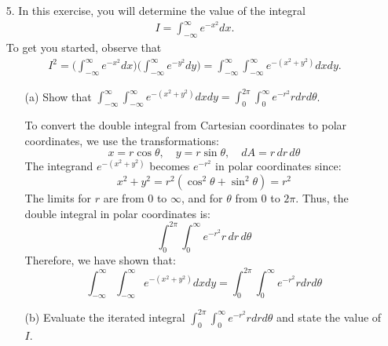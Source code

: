 \documentclass[reqno, 12pt]{amsart}
\begin{document}
\begin{itemize}
  \item[5.] In this exercise, you will determine the value of the integral
    \begin{align*}
      I = \int_{-\infty}^\infty e^{-x^2}dx.
    \end{align*}
    To get you started, observe that
    \begin{align*}
      I^2 = \Big(\int_{-\infty}^\infty e^{-x^2}dx\Big)\Big(\int_{-\infty}^\infty e^{-y^2}dy\Big) = \int_{-\infty}^\infty\int_{-\infty}^\infty e^{-(x^2+y^2)}dxdy.
    \end{align*}

    \begin{itemize}
      \item[(a)] Show that $\displaystyle\int_{-\infty}^\infty\int_{-\infty}^\infty e^{-(x^2+y^2)}dxdy = \int_0^{2\pi}\int_0^\infty e^{-r^2}rdrd\theta$.
        \newline

        \begin{answerbox}
          To convert the double integral from Cartesian coordinates to polar coordinates, we use the transformations:
          \[x = r\cos\theta, \quad y = r\sin\theta, \quad dA = r \, dr \, d\theta\]
          The integrand $e^{-(x^2 + y^2)}$ becomes $e^{-r^2}$ in polar coordinates since:
          \[x^2 + y^2 = r^2(\cos^2\theta + \sin^2\theta) = r^2\]
          The limits for $r$ are from $0$ to $\infty$, and for $\theta$ from $0$ to $2\pi$. Thus, the double integral in polar coordinates is:
          \[\int_{0}^{2\pi} \int_{0}^{\infty} e^{-r^2} r \, dr \, d\theta\]
          Therefore, we have shown that:
          \[\int_{-\infty}^\infty\int_{-\infty}^\infty e^{-(x^2+y^2)}dxdy = \int_0^{2\pi}\int_0^\infty e^{-r^2}rdrd\theta\]
        \end{answerbox}
        \vspace{0.5 in}
      \item[(b)] Evaluate the iterated integral $\displaystyle\int_0^{2\pi}\int_0^\infty e^{-r^2}rdrd\theta$ and state the value of $I$.
        \newline


\end{itemize}
\end{itemize}
\end{document}
